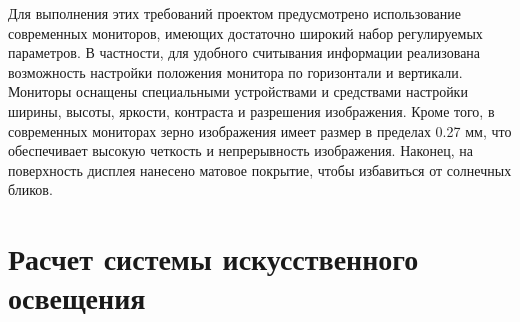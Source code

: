 Для выполнения этих требований проектом предусмотрено использование современных мониторов, имеющих достаточно широкий набор регулируемых параметров. В частности, для удобного считывания информации реализована возможность настройки положения монитора по горизонтали и вертикали. Мониторы оснащены специальными устройствами и средствами настройки ширины, высоты, яркости, контраста и разрешения изображения. Кроме того, в современных мониторах зерно изображения имеет размер в пределах 0.27 мм, что обеспечивает высокую четкость и непрерывность изображения. Наконец, на поверхность дисплея нанесено матовое покрытие, чтобы избавиться от солнечных бликов.

\section{Расчет системы искусственного освещения}

